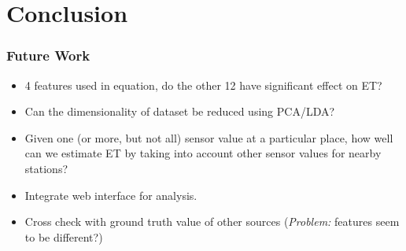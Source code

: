 \section{Conclusion}
\begin{frame}
\frametitle{Future Work}
\begin{itemize}[<+->]
\setlength\itemsep{1em}
\item 4 features used in equation, do the other 12 have significant effect on ET?
\item Can the dimensionality of dataset be reduced using PCA/LDA?
\item Given one (or more, but not all) sensor value at a particular place, how well can we estimate ET by taking into account other sensor values for nearby stations?
\item Integrate web interface for analysis.
\item Cross check with ground truth value of other sources (\textit{Problem:} features seem to be different?)
\end{itemize}
\end{frame}
